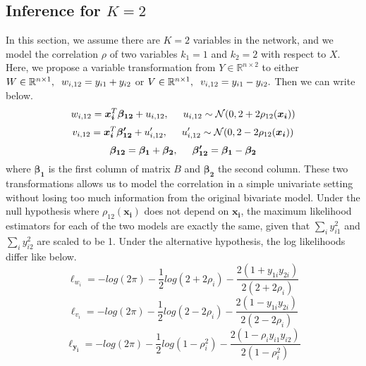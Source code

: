 \documentclass[12pt]{extarticle}
\theoremstyle{theorem}
\begin{document}
\subsection{Inference for $K=2$}
In this section, we assume there are $K=2$ variables in the network, and we model the correlation $\rho$ of two variables $k_1 = 1$ and $k_2 = 2$ with respect to $X$. Here, we propose a variable transformation from $Y \in \mathbb{R}^{n \times 2}$ to either $W\in \mathbb{R}^{n\times 1}, \hspace{2mm}w_{i,12} = y_{i1} + y_{i2}$ or $V \in \mathbb{R}^{n \times 1}, \hspace{2mm}v_{i,12} = y_{i1} - y_{i2}.$ Then we can write below.
\begin{equation}
w_{i,12} = \bm{x_i}^T \bm{\beta_{12}} + u_{i,12}, \hspace{5mm} u_{i,12} \sim \mathcal{N}(0, 2 + 2 \rho_{12}(\bm{x_i}))
\label{eqw2}
\end{equation}
\begin{equation}
v_{i,12} = \bm{x_i}^T \bm{\beta'_{12}} + u'_{i,12}, \hspace{5mm} u'_{i,12} \sim \mathcal{N}(0, 2 - 2 \rho_{12}(\bm{x_i}))
\label{eqv2}
\end{equation}
$$\bm{\beta_{12}} = \bm{\beta_1} + \bm{\beta_2},\hspace{5mm} \bm{\beta'_{12}} = \bm{\beta_1} - \bm{\beta_2}$$
where $\bm{\beta_1}$ is the first column of matrix $B$ and $\bm{\beta_2}$ the second column. These two transformations allows us to model the correlation in a simple univariate setting without losing too much information from the original bivariate model. Under the null hypothesis where $\rho_{12}(\bm{x_i})$ does not depend on $\bm{x_i}$, the maximum likelihood estimators for each of the two models are exactly the same, given that $\sum_i y_{i1}^2$ and $\sum_i y_{i2}^2$ are scaled to be 1. Under the alternative hypothesis, the log likelihoods differ like below.
$$\ell_{w_i} = -log(2\pi) - \frac{1}{2} log(2+2\rho_i) - \frac{2(1 + y_{1i}y_{2i})}{2(2+2\rho_i)}$$
$$\ell_{v_i} = -log(2\pi) - \frac{1}{2} log(2-2\rho_i) - \frac{2(1 - y_{1i}y_{2i})}{2(2-2\rho_i)}$$
$$\ell_{\bm{y_i}} = -log(2\pi) - \frac{1}{2} log(1-\rho_i^2) - \frac{2(1-\rho_i y_{i1}y_{i2})}{2(1-\rho_i^2)}$$
\end{document}
